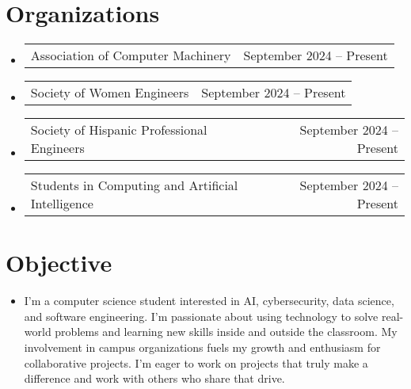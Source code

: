 \documentclass[letterpaper,11pt]{article}
\makeatletter
\newcommand{\resumeItem}[1]{
  \item\small{
    {#1 \vspace{-2pt}}
  }
}
\newcommand{\resumeProjectHeading}[2]{
    \item
    \begin{tabular*}{0.97\textwidth}{l@{\extracolsep{\fill}}r}
      \small#1 & #2 \\
    \end{tabular*}\vspace{-7pt}
}
\newcommand{\resumeSubHeadingListStart}{\begin{itemize}[leftmargin=0.15in, label={}]}
\newcommand{\resumeSubHeadingListEnd}{\end{itemize}}
\makeatother
\begin{document}
\section{Organizations}

\resumeSubHeadingListStart
\resumeProjectHeading
    {{Association of Computer Machinery} \emph}{September 2024 -- Present}
\resumeProjectHeading
    {{Society of Women Engineers} \emph}{September 2024 -- Present}
\resumeProjectHeading
    {{Society of Hispanic Professional Engineers} \emph}{September 2024 -- Present}  
\resumeProjectHeading
    {{Students in Computing and Artificial Intelligence} \emph}{September 2024 -- Present}
\resumeSubHeadingListEnd

\section{Objective}
\resumeSubHeadingListStart
    \resumeItem{I'm a computer science student interested in AI, cybersecurity, data science, and software engineering. I’m passionate 
    about using technology to solve real-world problems and learning new skills inside and outside the classroom. 
    My involvement in campus organizations fuels my growth and enthusiasm for collaborative projects. I’m eager to work on projects 
    that truly make a difference and work with others who share that drive.
    }
\resumeSubHeadingListEnd

\end{document}
